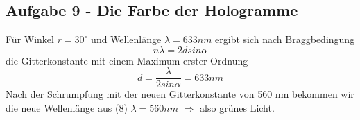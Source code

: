 \subsection*{Aufgabe 9 - Die Farbe der Hologramme}
Für Winkel $r = 30^{\circ}$ und Wellenlänge $\lambda = 633 nm$ ergibt sich nach Braggbedingung 
\begin{equation}
	n\lambda = 2dsin\alpha
\end{equation}
die Gitterkonstante mit einem Maximum erster Ordnung
\begin{equation}
	d = \frac{\lambda}{2sin\alpha} = 633 nm
\end{equation} 
Nach der Schrumpfung mit der neuen Gitterkonstante von 560 nm bekommen wir die neue Wellenlänge aus (8) $\lambda = 560 nm$ $\Rightarrow$ also grünes Licht.